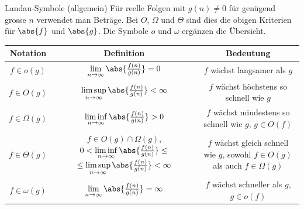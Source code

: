 \begin{frame}{Landau-Symbole (allgemein)}
	Für reelle Folgen mit $g(n)\neq 0$ für genügend grosse $n$ verwendet man Beträge. Bei $O$, $\Omega$ und $\Theta$ sind dies die obigen Kriterien für $\abs{f}$ und $\abs{g}$. Die Symbole $o$ und $\omega$ ergänzen die Übersicht.\\
	\vspace{0.2cm}
	\centering
	\small
	\begin{tabular}{|c|c|c|}
		\hline
		\textbf{Notation} & \textbf{Definition}                                              & \textbf{Bedeutung}                                  \\
		\hline
		$f \in o(g)$      & $\lim\limits_{n \to \infty} \abs{\frac{f(n)}{g(n)}} = 0$         & $f$ wächst langsamer als $g$                        \\
		\hline
		$f \in O(g)$      & $\limsup\limits_{n \to \infty} \abs{\frac{f(n)}{g(n)}} < \infty$ & $f$ wächst höchstens so schnell wie $g$             \\
		\hline
		$f \in \Omega(g)$ & $\liminf\limits_{n \to \infty} \abs{\frac{f(n)}{g(n)}} > 0$      & \makecell{$f$ wächst mindestens so schnell wie $g$, \\$g\in O(f)$}                          \\
		\hline
		$f \in \Theta(g)$ & \makecell{$f \in O(g)\cap \Omega(g)$,                                                                                  \\ $0 < \liminf\limits_{n \to \infty} \abs{\frac{f(n)}{g(n)}} \leq$ \\ $\leq\limsup\limits_{n \to \infty} \abs{\frac{f(n)}{g(n)}} < \infty$} & \makecell{$f$ wächst gleich schnell wie $g$,        \\sowohl $f\in O(g)$ als auch $f\in\Omega(g)$} \\
		\hline
		$f \in \omega(g)$ & $\lim\limits_{n \to \infty} \abs{\frac{f(n)}{g(n)}} = \infty$    & \makecell{$f$ wächst schneller als $g$,             \\$g\in o(f)$}                                      \\
		\hline
	\end{tabular}
\end{frame}

